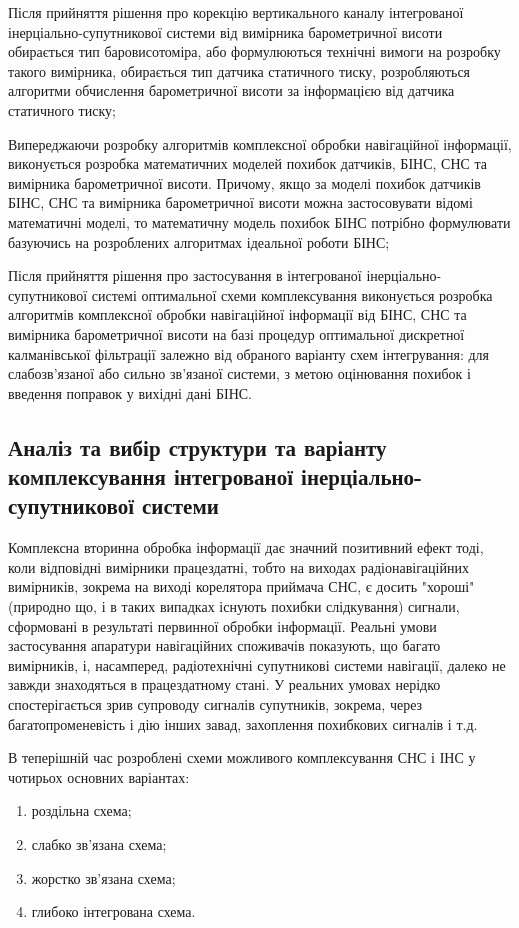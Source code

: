 Після прийняття рішення про корекцію вертикального каналу інтегрованої 
інерціально-супутникової системи від вимірника барометричної висоти обирається 
тип баровисотоміра, або формулюються технічні вимоги на розробку такого 
вимірника, обирається тип датчика статичного тиску, розробляються алгоритми 
обчислення барометричної висоти за інформацією від датчика статичного тиску;

Випереджаючи розробку алгоритмів комплексної обробки навігаційної 
інформації, виконується розробка математичних моделей похибок датчиків, 
БІНС, СНС та вимірника барометричної висоти. Причому, якщо за моделі 
похибок датчиків БІНС, СНС та вимірника барометричної висоти можна 
застосовувати відомі математичні моделі, то математичну модель похибок 
БІНС потрібно формулювати базуючись на розроблених алгоритмах ідеальної 
роботи БІНС;

Після прийняття рішення про застосування в інтегрованої інерціально-супутникової 
системі оптимальної схеми комплексування виконується розробка алгоритмів 
комплексної обробки навігаційної інформації від БІНС, СНС та вимірника 
барометричної висоти на базі процедур оптимальної дискретної калманівської 
фільтрації залежно від обраного варіанту схем інтегрування: для слабозв'язаної 
або сильно зв’язаної системи, з метою оцінювання похибок і введення поправок у 
вихідні дані БІНС.

\subsection{Аналіз та вибір структури та варіанту комплексування інтегрованої
інерціально-супутникової системи}

Комплексна вторинна обробка інформації дає значний позитивний ефект тоді, 
коли відповідні вимірники працездатні, тобто на виходах радіонавігаційних 
вимірників, зокрема на виході корелятора приймача СНС,  є досить "хороші" 
(природно що, і в таких випадках  існують похибки слідкування) сигнали, 
сформовані в результаті первинної обробки інформації. Реальні умови застосування 
апаратури навігаційних споживачів показують, що багато вимірників, і, насамперед, 
радіотехнічні супутникові системи навігації, далеко не завжди знаходяться в 
працездатному стані. У реальних умовах нерідко спостерігається зрив супроводу 
сигналів супутників, зокрема, через багатопроменевість і дію інших завад, 
захоплення похибкових сигналів і т.д.

В теперішній час розроблені схеми можливого комплексування СНС і ІНС у чотирьох 
основних варіантах:
\begin{enumerate}
\item роздільна схема;
\item слабко зв'язана схема;
\item жорстко зв'язана схема;
\item глибоко інтегрована схема.
\end{enumerate}

